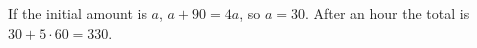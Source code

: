 If the initial amount is $a$, $a+90=4a$, so $a=30$. After an hour the total is $30+5\cdot60=\boxed{330}$.
